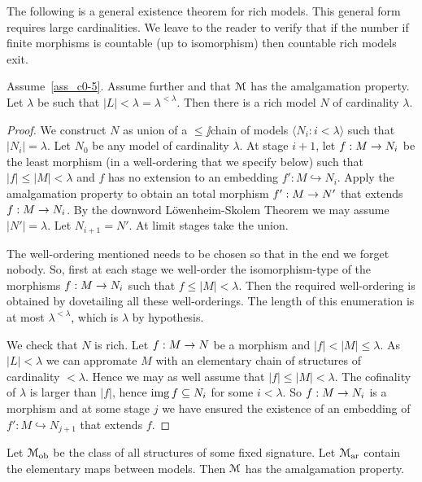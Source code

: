 \documentclass[creche.tex]{subfiles}
\begin{document}
The following is a general existence theorem for rich models. This general form requires large cardinalities. We leave to the reader to verify that if the number if finite morphisms is countable (up to isomorphism) then countable rich models exit.


\begin{theorem}  Assume~\ref{ass_c0-5}. Assume further  and that $\EuScript M$ has the amalgamation property. Let $\lambda$ be such that $|L|<\lambda=\lambda^{<\lambda}$.  Then there is a rich model $N$ of cardinality $\lambda$.
\end{theorem}

\begin{proof} We construct $N$ as union of a $\le\jj$chain of models $\langle N_i:i < \lambda\rangle$ such that $|N_i| = \lambda$. Let $N_0$ be any model of cardinality $\lambda$. At stage $i+1$, let $f:M\rightarrow N_i$ be the least morphism (in a well-ordering that we specify below) such that $|f|\le|M|<\lambda$ and $f$ has no extension to an embedding $f':M\hookrightarrow N_i$. Apply the amalgamation property to obtain an total morphism $f':M\rightarrow N'$ that extends $f:M\rightarrow N_i$. By the downword L\"owenheim-Skolem Theorem we may assume $|N'|=\lambda$. Let $N_{i+1}=N'$. At limit stages take the union.

The well-ordering mentioned needs to be chosen so that in the end we forget nobody. So, first at each stage we well-order the isomorphism-type of the morphisms $f:M\rightarrow N_i$ such that  $f\le|M|<\lambda$. Then the required well-ordering is obtained by dovetailing all these well-orderings.  The length of this enumeration is at most $\lambda^{<\lambda}$, which is $\lambda$ by hypothesis.

We check that $N$ is rich. Let $f:M\rightarrow N$ be a morphism and $|f|<|M|\le\lambda$. As $|L|<\lambda$ we can appromate $M$ with an elementary chain of structures of cardinality $<\lambda$. Hence we may as well assume that $|f|\le|M|<\lambda$. The cofinality of $\lambda$ is larger than $|f|$, hence $\mathop{\rm img} f\subseteq N_i$ for some $i<\lambda$. So $f:M\rightarrow N_i$ is a morphism and at some stage $j$ we have ensured the existence of an embedding of $f':M\hookrightarrow N_{j+1}$ that extends $f$.
\end{proof}

\begin{proposition}\label{prop_elementary_amalg}
Let $\EuScript M_{\rm ob}$ be the class of all structures of some fixed signature. Let $\EuScript M_{\rm ar}$ contain the elementary maps between models. Then $\EuScript M$ has the amalgamation property.
\end{proposition}
\end{document}
